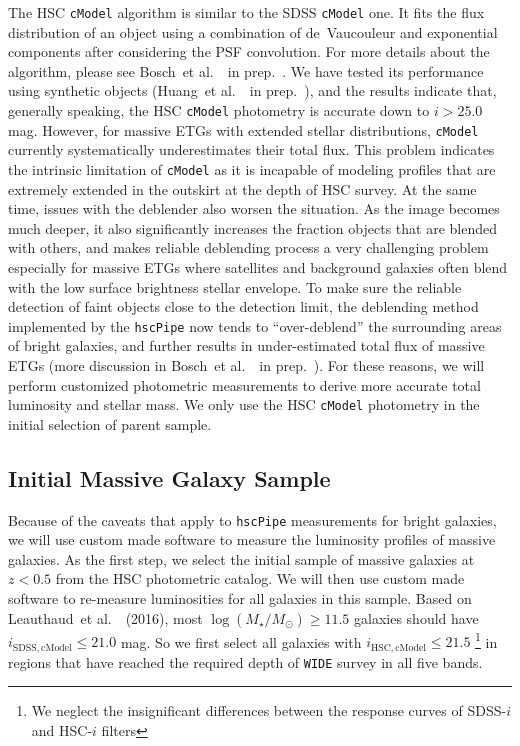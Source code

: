 \documentclass{emulateapj}
\def\etal{{\ et al.~}}
\def\cmodel{\texttt{cModel}}
\def\logms{{$\log (M_{\star}/M_{\odot})$}}
\newcommand{\update}[1]{\textcolor{Bittersweet}{#1}}
\begin{document}
\begin{CJK*}{UTF8}{gbsn}
    The HSC \cmodel{} algorithm is similar to the SDSS \cmodel{} one.  
    It fits the flux distribution of an object using a combination of de~Vaucouleur and 
    exponential components after considering the PSF convolution.  
    For more details about the algorithm, please see Bosch\etal~in prep.~.
    We have tested its performance using synthetic objects (Huang\etal~in prep.~), and 
    the results indicate that, generally speaking, the HSC \cmodel{} photometry is 
    accurate down to $i >25.0$ mag.  
    However, for massive ETGs with extended stellar distributions, \cmodel{} currently 
    systematically underestimates their total flux.
    This problem indicates the intrinsic limitation of \cmodel{} as it is incapable of
    modeling profiles that are extremely extended in the outskirt at the depth of 
    HSC survey. 
    At the same time, issues with the deblender also worsen the situation. 
    As the image becomes much deeper, it also significantly increases the fraction 
    objects that are blended with others, and makes reliable deblending process 
    a very challenging problem especially for massive ETGs where satellites and 
    background galaxies often blend with the low surface brightness stellar envelope.
    To make sure the reliable detection of faint objects close to the detection limit, 
    the deblending method implemented by the \texttt{hscPipe} now tends to 
    ``over-deblend'' the surrounding areas of bright galaxies, and further results in 
    under-estimated total flux of massive ETGs (more discussion in 
    Bosch\etal~in prep.~).  
    For these reasons, we will perform customized photometric measurements to derive 
    more accurate total luminosity and stellar mass. 
    We only use the HSC \cmodel{} photometry in the initial selection of parent 
    sample.
    
\subsection{Initial Massive Galaxy Sample}
    \label{ssec:initial}
    
    Because of the caveats that apply to \texttt{hscPipe} measurements for bright 
    galaxies, we will use custom made software to measure the luminosity profiles of
    massive galaxies. 
    \update{
    As the first step, we select the initial sample of massive galaxies at $z < 0.5$
    from the HSC photometric catalog.}
    We will then use custom made software to re-measure luminosities for all galaxies 
    in this sample. 
    Based on Leauthaud\etal~(2016), most \logms{}$\geq 11.5$ galaxies should have 
    $i_{\mathrm{SDSS, cModel}} \leq 21.0$ mag.
    So we first select all galaxies with $i_{\mathrm{HSC, cModel}} \leq 21.5$ 
    \footnote{We neglect the insignificant differences between the response curves of
    SDSS-$i$ and HSC-$i$ filters}
    in regions that have reached the required depth of \texttt{WIDE} survey in all 
    five bands. 
    

\end{CJK*}
\end{document}
